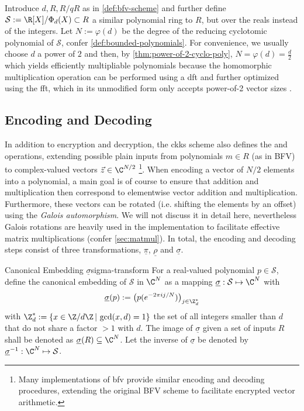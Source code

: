 Introduce $d, R, R/qR$ as in \cref{def:bfv-scheme} and further define $\mathcal{S} := \R[X] / \Phi_d(X) \subset R$ a similar polynomial ring to $R$, but over the reals instead of the integers.
Let $N := \varphi(d)$ be the degree of the reducing cyclotomic polynomial of $\mathcal{S}$, confer \cref{def:bounded-polynomials}.
For convenience, we usually choose $d$ a power of $2$ and then, by \cref{thm:power-of-2-cyclo-poly}, $N = \varphi(d) = \frac{d}{2}$ which yields efficiently multipliable polynomials because the homomorphic multiplication operation can be performed using a \gls{dft} and further optimized using the \gls{fft}, which in its unmodified form only accepts power-of-2 vector sizes \parencite{2017-ckks-original}.

\subsection{Encoding and Decoding}
In addition to encryption and decryption, the \gls{ckks} scheme also defines the  and  operations, extending possible plain inputs from polynomials $m \in R$ (as in BFV) to complex-valued vectors $\vec{z} \in \C^{N/2}$
\footnote{Many implementations of \gls{bfv} provide similar encoding and decoding procedures, extending the original BFV scheme \parencite{2012-fv-original} to facilitate encrypted vector arithmetic.}.
When encoding a vector of $N/2$ elements into a polynomial, a main goal is of course to ensure that addition and multiplication then correspond to elementwise vector addition and multiplication.
Furthermore, these vectors can be rotated (i.e. shifting the elements by an offset) using the \textit{Galois automorphism}.
We will not discuss it in detail here, nevertheless Galois rotations are heavily used in the implementation to facilitate effective matrix multiplications (confer \cref{sec:matmul}).
In total, the encoding and decoding steps consist of three transformations, $\underline{\pi}$, $\underline{\rho}$ and $\underline{\sigma}$.

\begin{definition}{Canonical Embedding $\underline{\sigma}$}{sigma-transform}
  For a real-valued polynomial $p \in \mathcal{S}$, define the canonical embedding of $\mathcal{S}$ in $\C^N$ as a mapping $\underline{\sigma}: \mathcal{S} \mapsto \C^N$ with $$\underline{\sigma}(p) := \big(p(e^{-2\pi i j / N})\big)_{j \in \Z_d^*}$$
  with $\Z_d^* := \{x \in \Z / d\Z \,|\, \gcd(x, d) = 1\}$ the set of all integers smaller than $d$ that do not share a factor $> 1$ with $d$.
  The image of $\underline{\sigma}$ given a set of inputs $R$ shall be denoted as $\underline{\sigma}(R) \subseteq \C^N$.
  Let the inverse of $\underline{\sigma}$ be denoted by $\underline{\sigma}\inv: \C^N \mapsto \mathcal{S}$.
\end{definition}


